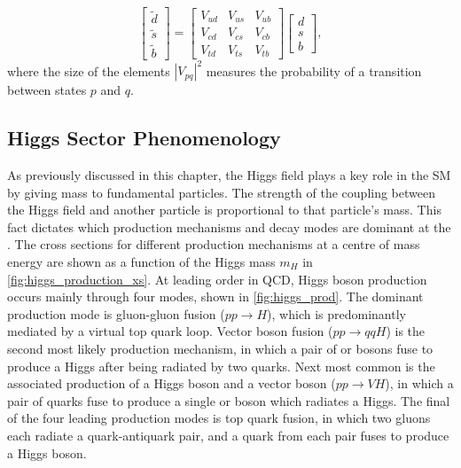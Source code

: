 %
\begin{equation}
    \begin{bmatrix}
        \tilde{d} \\ \tilde{s} \\ \tilde{b} 
    \end{bmatrix}
    = \begin{bmatrix}
        V_{ud} & V_{us} & V_{ub} \\  
        V_{cd} & V_{cs} & V_{cb} \\  
        V_{td} & V_{ts} & V_{tb} 
    \end{bmatrix}
    \begin{bmatrix}
        {d} \\ {s} \\ {b} 
    \end{bmatrix} ,
\end{equation}
%
where the size of the elements $|V_{pq}|^2$ measures the probability of a transition between states $p$ and $q$.




\subsection{Higgs Sector Phenomenology}\label{sec:higgs_pheno}


As previously discussed in this chapter, the Higgs field plays a key role in the SM by giving mass to fundamental particles. 
The strength of the coupling between the Higgs field and another particle is proportional to that particle's mass.
This fact dictates which production mechanisms and decay modes are dominant at the \LHC.
The cross sections for different production mechanisms at a centre of mass energy  are shown as a function of the Higgs mass $m_H$ in \cref{fig:higgs_production_xs}.
At leading order in QCD, Higgs boson production occurs mainly through four modes, shown in \cref{fig:higgs_prod}.
The dominant production mode is gluon-gluon fusion ($pp \rightarrow H$), which is predominantly mediated by a virtual top quark loop.
Vector boson fusion ($pp \rightarrow qqH$) is the second most likely production mechanism, in which a pair of \Wboson or \Zboson bosons fuse to produce a Higgs after being radiated by two quarks.
Next most common is the associated production of a Higgs boson and a vector boson ($pp \rightarrow VH$), in which a pair of quarks fuse to produce a single \Wboson or \Zboson boson which radiates a Higgs.
The final of the four leading production modes is top quark fusion, in which two gluons each radiate a quark-antiquark pair, and a quark from each pair fuses to produce a Higgs boson.

